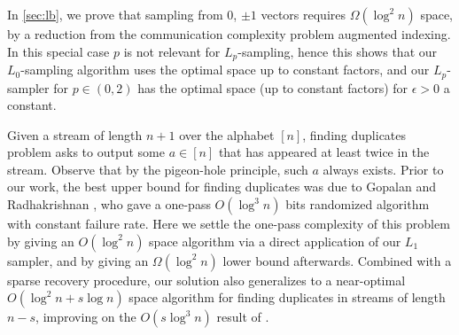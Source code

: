     In \autoref{sec:lb}, we prove that sampling from 0, $\pm1$
   vectors requires $\Omega(\log^2 n)$ space, by a reduction from 
   the communication complexity problem augmented indexing. 
   In this special case $p$ is not relevant for $L_p$-sampling, hence 
   this shows that our $L_0$-sampling algorithm uses the optimal space up to constant 
   factors, and our $L_p$-sampler for $p\in(0,2)$ has the optimal space (up to constant factors) for $\epsilon>0$ a constant. 

Given a stream of length $n+1$ over the alphabet $[n]$, finding
duplicates problem asks to output some $a\in[n]$ that has appeared
at least twice in the stream. Observe that by the pigeon-hole principle, 
such $a$ always exists. Prior to our work, the best upper bound
for finding duplicates was due to  Gopalan
and Radhakrishnan \cite{GopalanJaikumar}, who gave a one-pass $O(\log^3
n)$ bits randomized algorithm with constant failure rate.
Here we settle the one-pass complexity of this problem by 
giving an $O(\log^2 n)$ space algorithm via a direct application of our $L_1$
sampler, and by giving an $\Omega(\log^2 n)$ lower bound afterwards. Combined with a sparse recovery procedure,
our solution also generalizes to a near-optimal $O(\log^2n+s\log n)$ space
algorithm for finding duplicates in streams of length $n-s$, improving on the $O(s\log^3 n)$ result of \cite{GopalanJaikumar}.
  


